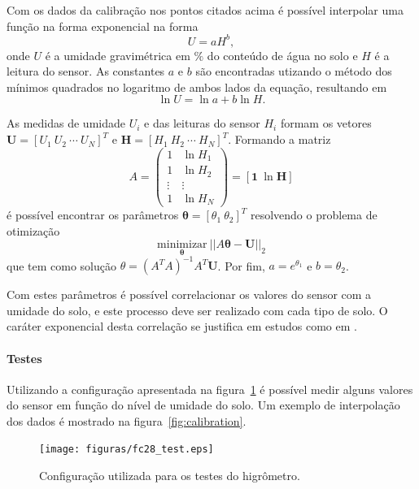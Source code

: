 			Com os dados da calibração nos pontos citados acima é possível
			interpolar uma função na forma exponencial na forma
			\[
				U = a H^b,
			\]
			onde $U$ é a umidade gravimétrica em $\%$ do conteúdo de água
			no solo e $H$ é a leitura do sensor. As constantes $a$ e $b$
			são encontradas utizando o método dos mínimos quadrados
			no logaritmo de ambos lados da equação, resultando em
			\[
				\ln U = \ln a + b \ln H.
			\]

			As medidas de umidade $U_i$ e das leituras do sensor $H_i$
			formam os vetores $\mathbf{U} = [U_1~U_2~\cdots~U_N]^T$ e
			$\mathbf{H} = [H_1~H_2~\cdots~H_N]^T$. Formando a matriz
			\[
				A =
				\begin{pmatrix}
					1 & \ln H_1 \\
					1 & \ln H_2 \\
					\vdots & \vdots \\
					1 & \ln H_N
				\end{pmatrix} = [ \mathbf{1}~\ln \mathbf{H} ]
			\]
			é possível encontrar os parâmetros $\mathbf{\theta} = [\theta_1~\theta_2]^T$
			resolvendo o problema de otimização
			\[
				\underset{\mathbf{\theta}}{\textrm{minimizar}}~|| A\mathbf{\theta} - \mathbf{U} ||_2
			\]
			que tem como solução $\theta = (A^TA)^{-1}A^T\mathbf{U}$.
			Por fim, $a = e^{\theta_1}$ e $b = \theta_2$.

			Com estes parâmetros é possível correlacionar os valores do
			sensor com a umidade do solo, e este processo deve ser realizado
			com cada tipo de solo.
			O caráter exponencial desta correlação se justifica em estudos
			como em .

		\newpage
		\paragraph{Testes}

			Utilizando a configuração apresentada na figura~\ref{fig:fc28test} é
			possível medir alguns valores do sensor em função do nível de
			umidade do solo. Um exemplo de interpolação dos dados é mostrado
			na figura~\ref{fig:calibration}.

			\begin{figure}[!htbp]
			\begin{center}
			\texttt{[image: figuras/fc28\_test.eps]}
			\caption{\label{fig:fc28test}Configuração utilizada para os testes do higrômetro.}
			\end{center}
			\end{figure}

